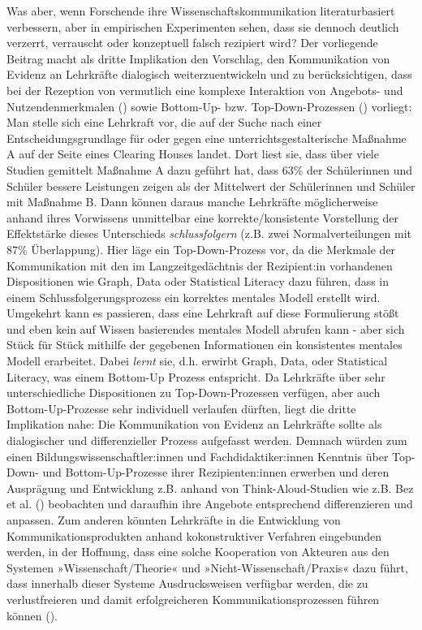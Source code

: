 \documentclass[
  jou,
  floatsintext,
  longtable,
  nolmodern,
  notxfonts,
  notimes,
  colorlinks=true,linkcolor=blue,citecolor=blue,urlcolor=blue]{apa7}
\begin{document}
Was aber, wenn Forschende ihre Wissenschaftskommunikation
literaturbasiert verbessern, aber in empirischen Experimenten sehen,
dass sie dennoch deutlich verzerrt, verrauscht oder konzeptuell falsch
rezipiert wird? Der vorliegende Beitrag macht als dritte Implikation den
Vorschlag, den Kommunikation von Evidenz an Lehrkräfte dialogisch
weiterzuentwickeln und zu berücksichtigen, dass bei der Rezeption von
vermutlich eine komplexe Interaktion von Angebots- und
Nutzendenmerkmalen () sowie Bottom-Up- bzw. Top-Down-Prozessen
() vorliegt: Man stelle sich
eine Lehrkraft vor, die auf der Suche nach einer Entscheidungsgrundlage
für oder gegen eine unterrichtsgestalterische Maßnahme A auf der Seite
eines Clearing Houses landet. Dort liest sie, dass über viele Studien
gemittelt Maßnahme A dazu geführt hat, dass 63\% der Schülerinnen und
Schüler bessere Leistungen zeigen als der Mittelwert der Schülerinnen
und Schüler mit Maßnahme B. Dann können daraus manche Lehrkräfte
möglicherweise anhand ihres Vorwissens unmittelbar eine
korrekte/konsistente Vorstellung der Effektstärke dieses Unterschieds
\emph{schlussfolgern} (z.B. zwei Normalverteilungen mit 87\%
Überlappung). Hier läge ein Top-Down-Prozess vor, da die Merkmale der
Kommunikation mit den im Langzeitgedächtnis der Rezipient:in vorhandenen
Dispositionen wie Graph, Data oder Statistical Literacy dazu führen,
dass in einem Schlussfolgerungsprozess ein korrektes mentales Modell
erstellt wird. Umgekehrt kann es passieren, dass eine Lehrkraft auf
diese Formulierung stößt und eben kein auf Wissen basierendes mentales
Modell abrufen kann - aber sich Stück für Stück mithilfe der gegebenen
Informationen ein konsistentes mentales Modell erarbeitet. Dabei
\emph{lernt} sie, d.h. erwirbt Graph, Data, oder Statistical Literacy,
was einem Bottom-Up Prozess entspricht. Da Lehrkräfte über sehr
unterschiedliche Dispositionen zu Top-Down-Prozessen verfügen, aber auch
Bottom-Up-Prozesse sehr individuell verlaufen dürften, liegt die dritte
Implikation nahe: Die Kommunikation von Evidenz an Lehrkräfte sollte als
dialogischer und differenzieller Prozess aufgefasst werden. Demnach
würden zum einen Bildungswissenschaftler:innen und Fachdidaktiker:innen
Kenntnis über Top-Down- und Bottom-Up-Prozesse ihrer Rezipienten:innen
erwerben und deren Ausprägung und Entwicklung z.B. anhand von
Think-Aloud-Studien wie z.B. Bez et al. ()
beobachten und daraufhin ihre Angebote entsprechend differenzieren und
anpassen. Zum anderen könnten Lehrkräfte in die Entwicklung von
Kommunikationsprodukten anhand kokonstruktiver Verfahren eingebunden
werden, in der Hoffnung, dass eine solche Kooperation von Akteuren aus
den Systemen »Wissenschaft/Theorie« und »Nicht-Wissenschaft/Praxis« dazu
führt, dass innerhalb dieser Systeme Ausdrucksweisen verfügbar werden,
die zu verlustfreieren und damit erfolgreicheren Kommunikationsprozessen
führen können ().
\end{document}
